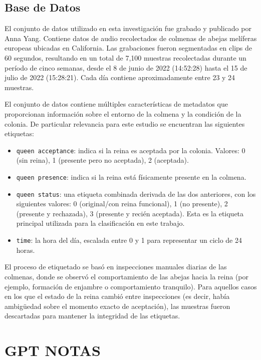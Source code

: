 \documentclass[12pt]{report}
\begin{document}
\subsection{Base de Datos}

El conjunto de datos utilizado en esta investigación fue grabado y publicado por Anna Yang\cite{AnnaYang-Dataset}. Contiene datos de audio recolectados de colmenas de abejas melíferas europeas ubicadas en California. Las grabaciones fueron segmentadas en clips de 60 segundos, resultando en un total de 7,100 muestras recolectadas durante un período de cinco semanas, desde el 8 de junio de 2022 (14:52:28) hasta el 15 de julio de 2022 (15:28:21). Cada día contiene aproximadamente entre 23 y 24 muestras.

El conjunto de datos contiene múltiples características de metadatos que proporcionan información sobre el entorno de la colmena y la condición de la colonia. De particular relevancia para este estudio se encuentran las siguientes etiquetas:

\begin{itemize}[label=]
	\item \texttt{queen acceptance}: indica si la reina es aceptada por la colonia. Valores: 0 (sin reina), 1 (presente pero no aceptada), 2 (aceptada).
	\item \texttt{queen presence}: indica si la reina está físicamente presente en la colmena.
	\item \texttt{queen status}: una etiqueta combinada derivada de las dos anteriores, con los siguientes valores: 0 (original/con reina funcional), 1 (no presente), 2 (presente y rechazada), 3 (presente y recién aceptada). Esta es la etiqueta principal utilizada para la clasificación en este trabajo.
	\item \texttt{time}: la hora del día, escalada entre 0 y 1 para representar un ciclo de 24 horas.
\end{itemize}

El proceso de etiquetado se basó en inspecciones manuales diarias de las colmenas, donde se observó el comportamiento de las abejas hacia la reina (por ejemplo, formación de enjambre o comportamiento tranquilo). Para aquellos casos en los que el estado de la reina cambió entre inspecciones (es decir, había ambigüedad sobre el momento exacto de aceptación), las muestras fueron descartadas para mantener la integridad de las etiquetas.

\section{GPT NOTAS}
\end{document}
